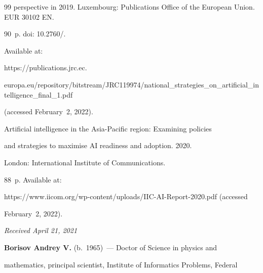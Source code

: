 {{\begin{thebibliography}{99}
perspective in 2019. Luxembourg: Publications Office of the European Union. EUR 30102 EN.


90~p. doi: 10.2760\!/.


Available at: 


{\sf https://publications.jrc.ec.\linebreak


 europa.eu/repository/bitstream/JRC119974/national\_strategies\_on\_artificial\_\linebreak intelligence\_final\_1.pdf}


 (accessed February~2, 2022).




Artificial intelligence in the Asia-Pacific region: Examining policies 


and strategies to maximise AI readiness and adoption. 2020. 


London: International Institute of Communications. 


88~p. Available at: 


{\sf https://www.iicom.org/wp-content/uploads/IIC-AI-Report-2020.pdf} (accessed 


February~2, 2022).


\end{thebibliography}


} }





\vspace*{-6pt}





\hfill{\small\textit{Received April 21, 2021}} 





\vspace*{-15pt}  


     


     \Contr


     


     \vspace*{-3pt}


     


      \noindent


     \textbf{Borisov Andrey V.} (b.\ 1965)~--- Doctor of Science in physics and 


mathematics, principal scientist, Institute of Informatics Problems, Federal 


